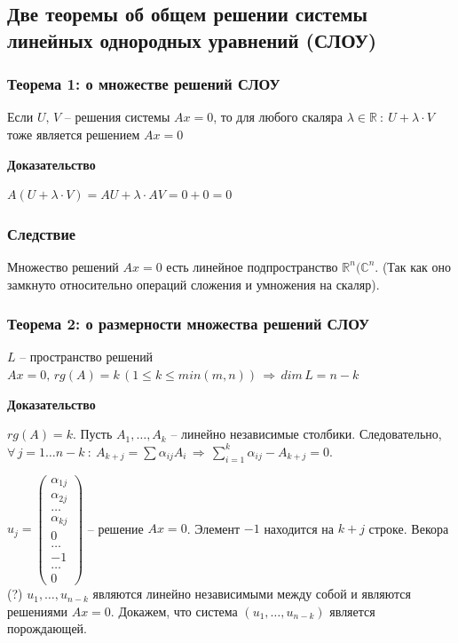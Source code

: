 \documentclass{article}
\newcommand{\R}{\mathbb R}
\begin{document}
\subsection{Две теоремы об общем решении системы линейных однородных уравнений (СЛОУ)}
\subsubsection{Теорема 1: о множестве решений СЛОУ}
Если $U,\,V$ -- решения системы $Ax=0$, то для любого скаляра $\lambda\in\R\::\:U+\lambda\cdot V$ тоже является решением $Ax=0$

\textbf{Доказательство}

$A(U+\lambda\cdot V)=AU+\lambda\cdot AV = 0+0=0$

\subsubsection{Следствие}

Множество решений $Ax=0$ есть линейное подпространство $\R^n(\mathbb{C}^n$.
(Так как оно замкнуто относительно операций сложения и умножения на скаляр).
\subsubsection{Теорема 2: о размерности множества решений СЛОУ}
$L$ -- пространство решений $Ax=0,\,rg(A)=k\,(1\leqslant k\leqslant min(m,n))\,\Rightarrow\,dim\,L=n-k$

\textbf{Доказательство}

$rg(A)=k$. Пусть $A_1,\ldots,A_k$ -- линейно независимые столбики. Следовательно, $\forall\,j=1\ldots n-k\::\: A_{k+j}=\sum\alpha_{ij}A_i\,\Rightarrow\,\sum\limits_{i=1}^k \alpha_{ij}-A_{k+j}=0$.

$
u_j=\begin{pmatrix} \alpha_{1j}\\ \alpha_{2j} \\ \ldots \\ \alpha_{kj} \\ 0 \\ \ldots \\ -1 \\ \ldots \\ 0 \end{pmatrix}
$ -- решение $Ax=0$. Элемент $-1$ находится на $k+j$ строке. 
\newpage
Векора (?) $u_1,\ldots,u_{n-k}$ являются линейно независимыми между собой и являются решениями $Ax=0$. Докажем, что система $(u_1,\ldots,u_{n-k})$ является порождающей.
\end{document}
